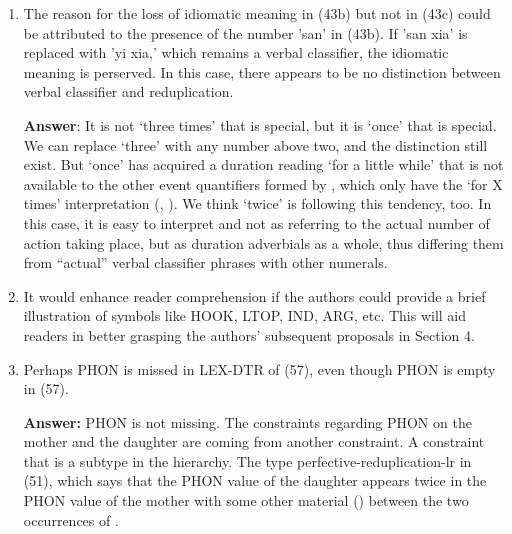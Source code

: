 \documentclass[fleqn,twoside]{article}
\begin{document}
\begin{enumerate}



\item
The reason for the loss of idiomatic meaning in (43b) but not in (43c) could be attributed to the
presence of the number 'san' in (43b). If 'san xia' is replaced with 'yi xia,' which remains a
verbal classifier, the idiomatic meaning is perserved. In this case, there appears to be no
distinction between verbal classifier and reduplication.

\noindent
\textbf{Answer}:
It is not   `three times' that is special, but it is   `once' that is special.
We can replace  `three' with any number above two,
and the distinction still exist.
But   `once' has acquired a duration reading `for a little while' that is not available to the other event quantifiers formed by , which only have the `for X times' interpretation (\citealt[77]{Deng2013}, \citealt[16]{Zhang2000}).
We think   `twice' is following this tendency, too.
In this case, it is easy to interpret   and   not as referring to the actual number of action taking place,
but as duration adverbials as a whole,
thus differing them from ``actual'' verbal classifier phrases with other numerals.

\item
It would enhance reader comprehension if the authors could provide a brief illustration of symbols
like HOOK, LTOP, IND, ARG, etc. This will aid readers in better grasping the authors' subsequent
proposals in Section 4.

\item
Perhaps PHON is missed in LEX-DTR of (57), even though PHON is empty in (57).

\noindent
\textbf{Answer:} PHON is not missing. The constraints regarding PHON on the mother and the daughter are coming from
another constraint. A constraint that is a subtype in the hierarchy. The type
perfective-reduplication-lr in (51), which says that the PHON value of the daughter  appears
twice in the PHON value of the mother with some other material (\etag) between the two occurrences of .

\end{enumerate}
\end{document}
